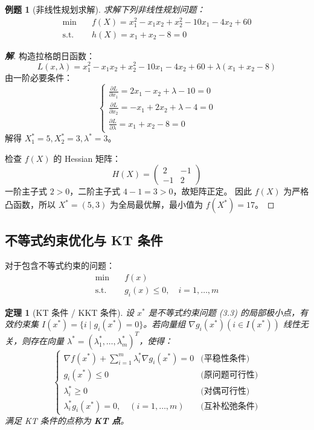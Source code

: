 \documentclass[a4paper,12pt]{ctexart} %
\newtheorem{theorem}{定理}[section]
\newtheorem{example}{例题}[section]
\newenvironment{solution}{\begin{proof}[\textbf{解}]}{\end{proof}}
\begin{document}
	\begin{example}[非线性规划求解]
		求解下列非线性规划问题：
		\[
		\begin{aligned}
			\min \quad & f(X) = x_1^2 - x_1 x_2 + x_2^2 - 10x_1 - 4x_2 + 60 \\
			\text{s.t.} \quad & h(X) = x_1 + x_2 - 8 = 0
		\end{aligned}
		\]
	\end{example}
	
	\begin{solution}
		构造拉格朗日函数：
		\[ L(x, \lambda) = x_1^2 - x_1 x_2 + x_2^2 - 10x_1 - 4x_2 + 60 + \lambda(x_1 + x_2 - 8) \]
		由一阶必要条件：
		\[
		\begin{cases}
			\frac{\partial L}{\partial x_1} = 2x_1 - x_2 + \lambda - 10 = 0 \\
			\frac{\partial L}{\partial x_2} = -x_1 + 2x_2 + \lambda - 4 = 0 \\
			\frac{\partial L}{\partial \lambda} = x_1 + x_2 - 8 = 0
		\end{cases}
		\]
		解得 $X_1^* = 5, X_2^* = 3, \lambda^* = 3$。
		
		检查 $f(X)$ 的 Hessian 矩阵：
		\[ H(X) = \begin{pmatrix} 2 & -1 \\ -1 & 2 \end{pmatrix} \]
		一阶主子式 $2 > 0$，二阶主子式 $4-1=3 > 0$，故矩阵正定。
		因此 $f(X)$ 为严格凸函数，所以 $X^*=(5,3)$ 为全局最优解，最小值为 $f(X^*) = 17$。
	\end{solution}
	
	\subsection{不等式约束优化与 KT 条件}
	
	对于包含不等式约束的问题：
	\begin{equation}
		\begin{aligned}
			\min \quad & f(x) \\
			\text{s.t.} \quad & g_i(x) \le 0, \quad i=1,\dots,m 
		\end{aligned}
		\tag{3.3}  %
	\end{equation}
	
	\begin{theorem}[KT 条件 / KKT 条件]
		设 $x^*$ 是不等式约束问题 (3.3) 的局部极小点，有效约束集 $I(x^*) = \{i \mid g_i(x^*) = 0\}$。若向量组 $\nabla g_i(x^*) (i \in I(x^*))$ 线性无关，则存在向量 $\lambda^* = (\lambda_1^*, \dots, \lambda_m^*)^T$，使得：
		\begin{equation}
			\begin{cases}
				\nabla f(x^*) + \sum_{i=1}^{m} \lambda_i^* \nabla g_i(x^*) = 0 & \text{(平稳性条件)} \\
				g_i(x^*) \le 0 & \text{(原问题可行性)} \\
				\lambda_i^* \ge 0 & \text{(对偶可行性)} \\
				\lambda_i^* g_i(x^*) = 0, \quad (i=1,\dots,m) & \text{(互补松弛条件)}
			\end{cases}
		\end{equation}
		满足 KT 条件的点称为 \textbf{KT 点}。
	\end{theorem}
	
\end{document}
